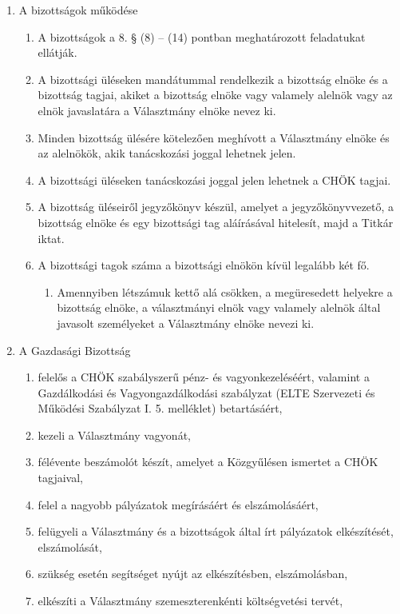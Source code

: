 \documentclass{../styles/rulebook}
\begin{document}
\begin{enumerate}
\begin{enumerate}
\begin{enumerate}
			\end{enumerate}
		\end{enumerate}
	\item A bizottságok működése
		\begin{enumerate}
		\item A bizottságok a 8. § (8) – (14) pontban meghatározott feladatukat ellátják.
		\item A bizottsági üléseken mandátummal rendelkezik a bizottság elnöke és a bizottság tagjai, akiket a bizottság elnöke vagy valamely alelnök vagy az elnök javaslatára a Választmány elnöke nevez ki. 
		\item Minden bizottság ülésére kötelezően meghívott a Választmány elnöke és az alelnökök, akik tanácskozási joggal lehetnek jelen.
		\item A bizottsági üléseken tanácskozási joggal jelen lehetnek a CHÖK tagjai.
		\item A bizottság üléseiről jegyzőkönyv készül, amelyet a jegyzőkönyvvezető, a bizottság elnöke és egy bizottsági tag aláírásával hitelesít, majd a Titkár iktat.
		\item A bizottsági tagok száma a bizottsági elnökön kívül legalább két fő. 
			\begin{enumerate}
			\item Amennyiben létszámuk kettő alá csökken, a megüresedett helyekre a bizottság elnöke, a választmányi elnök vagy valamely alelnök által javasolt személyeket a Választmány elnöke nevezi ki.
			\end{enumerate}
		\end{enumerate}
	\item A Gazdasági Bizottság
	\begin{enumerate}
		\item felelős a CHÖK szabályszerű pénz- és vagyonkezeléséért, valamint a Gazdálkodási és Vagyongazdálkodási szabályzat (ELTE Szervezeti és Működési Szabályzat I. 5. melléklet) betartásáért,
		\item kezeli a Választmány vagyonát,
		\item félévente beszámolót készít, amelyet a Közgyűlésen ismertet a CHÖK tagjaival,
		\item felel a nagyobb pályázatok megírásáért és elszámolásáért,
		\item felügyeli a Választmány és a bizottságok által írt pályázatok elkészítését, elszámolását,
		\item szükség esetén segítséget nyújt az elkészítésben, elszámolásban,
		\item elkészíti a Választmány szemeszterenkénti költségvetési tervét,

\end{enumerate}
\end{enumerate}
\end{document}

